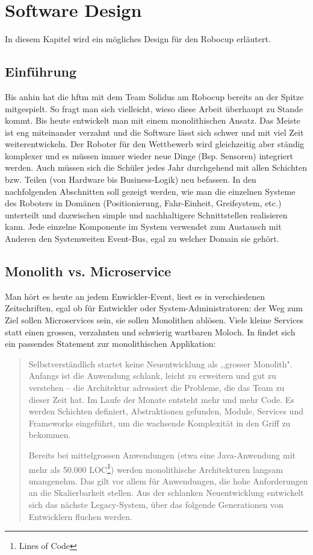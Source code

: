 \chapter{Software Design}
In diesem Kapitel wird ein mögliches Design für den Robocup erläutert.
\section{Einführung}
Bis anhin hat die \acrshort{hftm} mit dem Team Solidus am Robocup bereits an der Spitze mitgespielt. So fragt man sich vielleicht, wieso diese Arbeit überhaupt zu Stande kommt. Bis heute entwickelt man mit einem monolithischen Ansatz. Das Meiste ist eng miteinander verzahnt und die Software lässt sich schwer und mit viel Zeit weiterentwickeln. Der Roboter für den Wettbewerb wird gleichzeitig aber ständig komplexer und es müssen immer wieder neue Dinge (Bsp. Sensoren) integriert werden. Auch müssen sich die Schüler jedes Jahr durchgehend mit allen Schichten bzw. Teilen (von Hardware bis Business-Logik) neu befassen. In den nachfolgenden Abschnitten soll gezeigt werden, wie man die einzelnen Systeme des Roboters in Domänen (Positionierung, Fahr-Einheit, Greifsystem, etc.) unterteilt und dazwischen simple und nachhaltigere Schnittstellen realisieren kann.
Jede einzelne Komponente im System verwendet zum Austausch mit Anderen den Systemweiten Event-Bus, egal zu welcher Domain sie gehört.

\section{Monolith vs. Microservice}
Man hört es heute an jedem Enwickler-Event, liest es in verschiedenen Zeitschriften, egal ob für Entwickler oder System-Administratoren: der Weg zum Ziel sollen Microservices sein, sie sollen Monolithen ablösen. Viele kleine Services statt einen grossen, verzahnten und schwierig wartbaren Moloch. 
In \cite{informatik-aktuell-microservices} findet sich ein passendes Statement zur monolithischen Applikation:
\begin{quote}
	Selbstverständlich startet keine Neuentwicklung als ,,grosser Monolith". Anfangs ist die Anwendung schlank, leicht zu erweitern und gut zu verstehen – die Architektur adressiert die Probleme, die das Team zu dieser Zeit hat. Im Laufe der Monate entsteht mehr und mehr Code. Es werden Schichten definiert, Abstraktionen gefunden, Module, Services und Frameworks eingeführt, um die wachsende Komplexität in den Griff zu bekommen.
	
	Bereits bei mittelgrossen Anwendungen (etwa eine Java-Anwendung mit mehr als 50.000 LOC\footnote{Lines of Code}) werden monolithische Architekturen langsam unangenehm. Das gilt vor allem für Anwendungen, die hohe Anforderungen an die Skalierbarkeit stellen. Aus der schlanken Neuentwicklung entwickelt sich das nächste Legacy-System, über das folgende Generationen von Entwicklern fluchen werden.
\end{quote}
